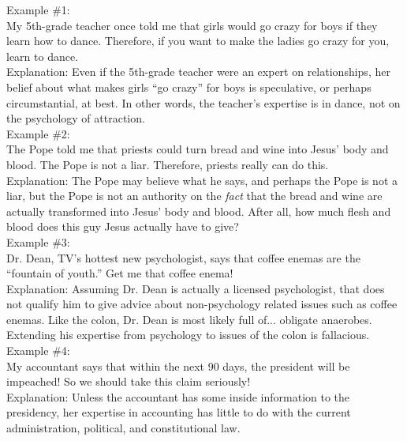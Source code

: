 \documentclass[a4paper,12pt,single,pdftex]{scrartcl}
\begin{document}
    
      Example \#1:
    \\

    
      My 5th-grade teacher once told me that girls would go crazy for boys if they learn how to dance.  Therefore, if you want to make the ladies go crazy for you, learn to dance.
    \\

    
      Explanation: Even if the 5th-grade teacher were an expert on relationships, her belief about what makes girls “go crazy” for boys is speculative, or perhaps circumstantial, at best. In other words, the teacher's expertise is in dance, not on the psychology of attraction.
    \\

    
      Example \#2:
    \\

    
      The Pope told me that priests could turn bread and wine into Jesus’ body and blood.  The Pope is not a liar. Therefore, priests really can do this.
    \\

    
      Explanation: The Pope may believe what he says, and perhaps the Pope is not a liar, but the Pope is not an authority on the {\it fact}  that the bread and wine are actually transformed into Jesus’ body and blood. After all, how much flesh and blood does this guy Jesus actually have to give? 
    \\

    
      Example \#3:
    \\

    
      Dr. Dean, TV’s hottest new psychologist, says that coffee enemas are the “fountain of youth.” Get me that coffee enema!
    \\

    
      Explanation: Assuming Dr. Dean is actually a licensed psychologist, that does not qualify him to give advice about non-psychology related issues such as coffee enemas. Like the colon, Dr. Dean is most likely full of... obligate anaerobes. Extending his expertise from psychology to issues of the colon is fallacious.
    \\

    
      Example \#4:
    \\

    
      My accountant says that within the next 90 days, the president will be impeached! So we should take this claim seriously!
    \\

    
      Explanation: Unless the accountant has some inside information to the presidency, her expertise in accounting has little to do with the current administration, political, and constitutional law.
    \\
\end{document}
